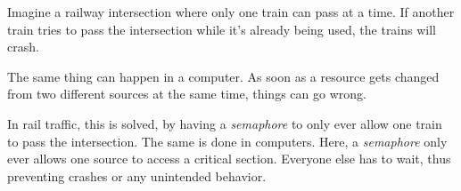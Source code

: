 
Imagine a railway intersection where only one train can pass at a time. If another train tries to pass the intersection while it's already being used, the trains will crash.

The same thing can happen in a computer. As soon as a resource gets changed from two different sources at the same time, things can go wrong.

In rail traffic, this is solved, by having a \emph{semaphore} to only ever allow one train to pass the intersection. The same is done in computers. Here, a \emph{semaphore} only ever allows one source to access a critical section. Everyone else has to wait, thus preventing crashes or any unintended behavior.


